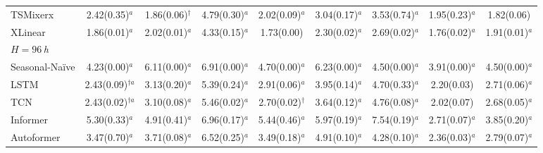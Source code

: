 \begin{table}[!t]
\begin{adjustbox}{max width=\linewidth}
\begin{tabular}{lcccccccc}
TSMixerx & 2.42{\scriptsize\color{gray}(0.35)}$^{a}$ & 1.86{\scriptsize\color{gray}(0.06)}$^{\dagger{}}$ & 4.79{\scriptsize\color{gray}(0.30)}$^{a}$ & 2.02{\scriptsize\color{gray}(0.09)}$^{a}$ & 3.04{\scriptsize\color{gray}(0.17)}$^{a}$ & 3.53{\scriptsize\color{gray}(0.74)}$^{a}$ & 1.95{\scriptsize\color{gray}(0.23)}$^{a}$ & 1.82{\scriptsize\color{gray}(0.06)} \\
XLinear & 1.86{\scriptsize\color{gray}(0.01)}$^{a}$ & 2.02{\scriptsize\color{gray}(0.01)}$^{a}$ & 4.33{\scriptsize\color{gray}(0.15)}$^{a}$ & 1.73{\scriptsize\color{gray}(0.00)} & 2.30{\scriptsize\color{gray}(0.02)}$^{a}$ & 2.69{\scriptsize\color{gray}(0.02)}$^{a}$ & 1.76{\scriptsize\color{gray}(0.02)}$^{a}$ & 1.91{\scriptsize\color{gray}(0.01)}$^{a}$ \\
\midrule
\multicolumn{9}{l}{\textit{$H=96$\,h}} \\
Seasonal-Na\"ive & 4.23{\scriptsize\color{gray}(0.00)}$^{a}$ & 6.11{\scriptsize\color{gray}(0.00)}$^{a}$ & 6.91{\scriptsize\color{gray}(0.00)}$^{a}$ & 4.70{\scriptsize\color{gray}(0.00)}$^{a}$ & 6.23{\scriptsize\color{gray}(0.00)}$^{a}$ & 4.50{\scriptsize\color{gray}(0.00)}$^{a}$ & 3.91{\scriptsize\color{gray}(0.00)}$^{a}$ & 4.50{\scriptsize\color{gray}(0.00)}$^{a}$ \\
LSTM & 2.43{\scriptsize\color{gray}(0.09)}$^{\dagger{}a}$ & 3.13{\scriptsize\color{gray}(0.20)}$^{a}$ & 5.39{\scriptsize\color{gray}(0.24)}$^{a}$ & 2.91{\scriptsize\color{gray}(0.06)}$^{a}$ & 3.95{\scriptsize\color{gray}(0.14)}$^{a}$ & 4.70{\scriptsize\color{gray}(0.33)}$^{a}$ & 2.20{\scriptsize\color{gray}(0.03)} & 2.71{\scriptsize\color{gray}(0.06)}$^{a}$ \\
TCN & 2.43{\scriptsize\color{gray}(0.02)}$^{\dagger{}a}$ & 3.10{\scriptsize\color{gray}(0.08)}$^{a}$ & 5.46{\scriptsize\color{gray}(0.02)}$^{a}$ & 2.70{\scriptsize\color{gray}(0.02)}$^{\dagger{}}$ & 3.64{\scriptsize\color{gray}(0.12)}$^{a}$ & 4.76{\scriptsize\color{gray}(0.08)}$^{a}$ & 2.02{\scriptsize\color{gray}(0.07)} & 2.68{\scriptsize\color{gray}(0.05)}$^{a}$ \\
Informer & 5.30{\scriptsize\color{gray}(0.33)}$^{a}$ & 4.91{\scriptsize\color{gray}(0.41)}$^{a}$ & 6.96{\scriptsize\color{gray}(0.17)}$^{a}$ & 5.44{\scriptsize\color{gray}(0.46)}$^{a}$ & 5.97{\scriptsize\color{gray}(0.19)}$^{a}$ & 7.54{\scriptsize\color{gray}(0.19)}$^{a}$ & 2.71{\scriptsize\color{gray}(0.07)}$^{a}$ & 3.85{\scriptsize\color{gray}(0.20)}$^{a}$ \\
Autoformer & 3.47{\scriptsize\color{gray}(0.70)}$^{a}$ & 3.71{\scriptsize\color{gray}(0.08)}$^{a}$ & 6.52{\scriptsize\color{gray}(0.25)}$^{a}$ & 3.49{\scriptsize\color{gray}(0.18)}$^{a}$ & 4.91{\scriptsize\color{gray}(0.10)}$^{a}$ & 4.28{\scriptsize\color{gray}(0.10)}$^{a}$ & 2.36{\scriptsize\color{gray}(0.03)}$^{a}$ & 2.79{\scriptsize\color{gray}(0.07)}$^{a}$ \\

\end{tabular}
\end{adjustbox}
\end{table}
